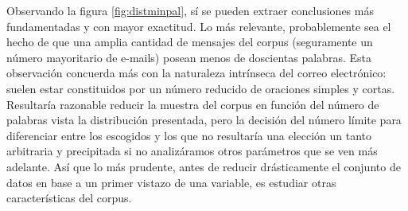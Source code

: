 Observando la figura \ref{fig:distminpal}, sí se pueden extraer conclusiones más fundamentadas y con mayor exactitud. Lo más relevante, probablemente sea el hecho de que una amplia cantidad de mensajes del corpus (seguramente un número mayoritario de e-mails) posean menos de doscientas palabras. Esta observación concuerda más con la naturaleza intrínseca del correo electrónico: suelen estar constituidos por un número reducido de oraciones simples y cortas. Resultaría razonable reducir la muestra del corpus en función del número de palabras vista la distribución presentada, pero la decisión del número límite para diferenciar entre los escogidos y los que no resultaría una elección un tanto arbitraria y precipitada si no analizáramos otros parámetros que se ven más adelante. Así que lo más prudente, antes de reducir drásticamente el conjunto de datos en base a un primer vistazo de una variable, es estudiar otras características del corpus.